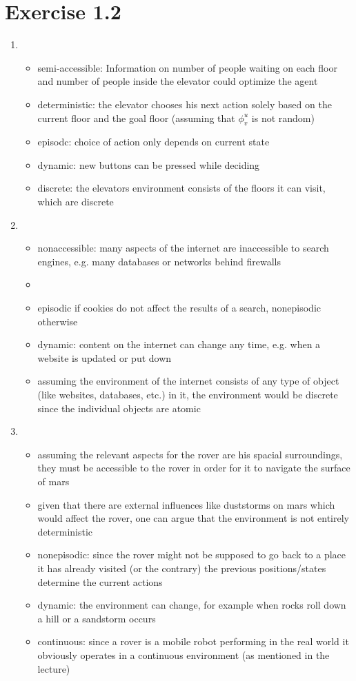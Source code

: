 \documentclass{article}
\begin{document}
\section*{Exercise 1.2}
\begin{enumerate}[label=(\alph*)]
	\item	\begin{itemize}
				\item	semi-accessible: Information on number of people waiting on each floor and number of people inside the elevator could optimize the agent
				\item	deterministic: the elevator chooses his next action solely based on the current floor and the goal floor (assuming that $\phi^u_v$ is not random) 
				\item	episodc: choice of action only depends on current state
				\item	dynamic: new buttons can be pressed while deciding
				\item	discrete: the elevators environment consists of the floors it can visit, which are discrete
			\end{itemize}
	\item	\begin{itemize}
				\item nonaccessible: many aspects of the internet are inaccessible to search engines, e.g. many databases or networks behind firewalls
				\item 
				\item episodic if cookies do not affect the results of a search, nonepisodic otherwise
				\item dynamic: content on the internet can change any time, e.g. when a website is updated or put down
				\item assuming the environment of the internet consists of any type of object (like websites, databases, etc.) in it, the environment would be discrete since the individual objects are atomic
			\end{itemize}
	\item	\begin{itemize}
				\item assuming the relevant aspects for the rover are his spacial surroundings, they must be accessible to the rover in order for it to navigate the surface of mars 
				\item given that there are external influences like duststorms on mars which would affect the rover, one can argue that the environment is not entirely deterministic
				\item nonepisodic: since the rover might not be supposed to go back to a place it has already visited (or the contrary) the previous positions/states determine the current actions
				\item dynamic: the environment can change, for example when rocks roll down a hill or a sandstorm occurs
				\item continuous: since a rover is a mobile robot performing in the real world it obviously operates in a continuous environment (as mentioned in the lecture) 
			\end{itemize}
\end{enumerate}
\end{document}
